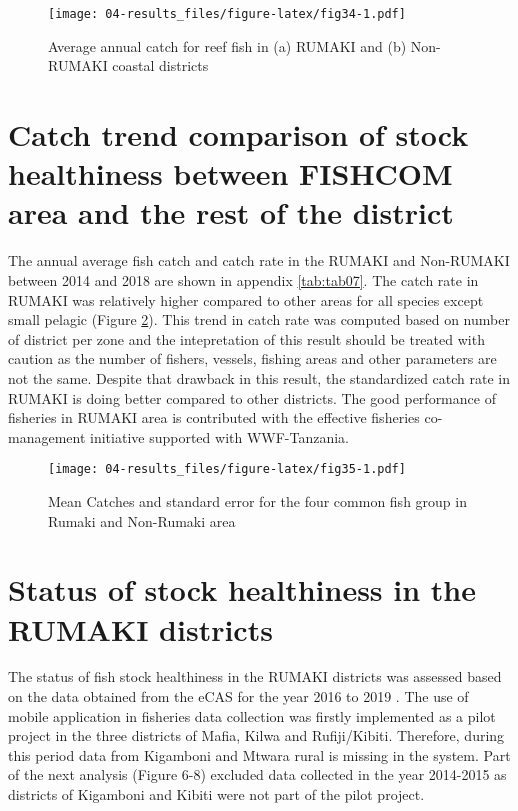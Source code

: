 \documentclass[
  12pt,
  a4paper,
  oneside]{book}
\begin{document}
\begin{figure}
\centering
\texttt{[image: 04-results\_files/figure-latex/fig34-1.pdf]}
\caption{\label{fig:fig34}Average annual catch for reef fish in (a) RUMAKI and (b) Non-RUMAKI coastal districts}
\end{figure}

\hypertarget{catch-trend-comparison-of-stock-healthiness-between-fishcom-area-and-the-rest-of-the-district}{%
\section{Catch trend comparison of stock healthiness between FISHCOM area and the rest of the district}\label{catch-trend-comparison-of-stock-healthiness-between-fishcom-area-and-the-rest-of-the-district}}

The annual average fish catch and catch rate in the RUMAKI and Non-RUMAKI between 2014 and 2018 are shown in appendix \ref{tab:tab07}. The catch rate in RUMAKI was relatively higher compared to other areas for all species except small pelagic (Figure \ref{fig:fig35}). This trend in catch rate was computed based on number of district per zone and the intepretation of this result should be treated with caution as the number of fishers, vessels, fishing areas and other parameters are not the same. Despite that drawback in this result, the standardized catch rate in RUMAKI  is doing better compared to other districts. The good performance of fisheries in RUMAKI area is contributed with the effective fisheries co-management initiative supported with WWF-Tanzania.

\begin{figure}
\centering
\texttt{[image: 04-results\_files/figure-latex/fig35-1.pdf]}
\caption{\label{fig:fig35}Mean Catches and standard error for the four common fish group in Rumaki and Non-Rumaki area}
\end{figure}

\hypertarget{status-of-stock-healthiness-in-the-rumaki-districts}{%
\section{Status of stock healthiness in the RUMAKI districts}\label{status-of-stock-healthiness-in-the-rumaki-districts}}

The status of fish stock healthiness in the RUMAKI districts was assessed based on the data obtained from the eCAS for the year 2016 to 2019 . The use of mobile application in fisheries data collection was firstly implemented as a pilot project in the three districts of Mafia, Kilwa and Rufiji/Kibiti. Therefore, during this period data from Kigamboni and Mtwara rural is missing in the system. Part of the next analysis (Figure 6-8) excluded data collected in the year 2014-2015 as districts of Kigamboni and Kibiti were not part of the pilot project.
\end{document}
